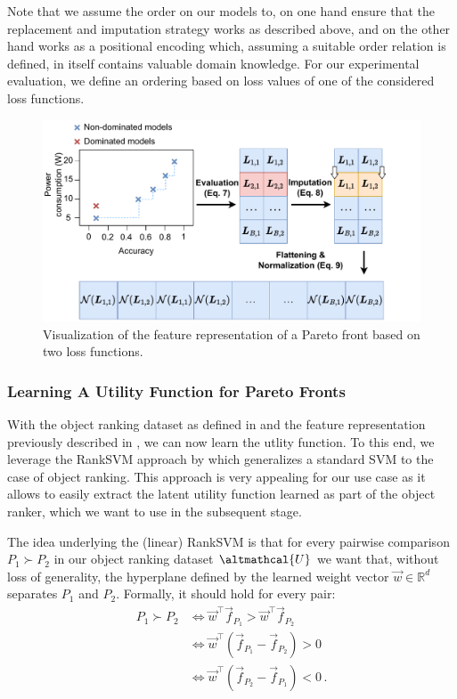 Note that we assume the order on our models to, on one hand ensure that the replacement and imputation strategy works as described above, and on the other hand works as a positional encoding which, assuming a suitable order relation is defined, in itself contains valuable domain knowledge. For our experimental evaluation, we define an ordering based on loss values of one of the considered loss functions.

\begin{figure}
\centering
\includegraphics[width=0.7\columnwidth]{chapters/human-centric/moo/img/preference_preparation.pdf}
\caption{Visualization of the feature representation of a Pareto front based on two loss functions.}
\label{moo-fig:preference_preparation}
\end{figure}

\subsubsection*{Learning A Utility Function for Pareto Fronts}

With the object ranking dataset as defined in  and the feature representation previously described in , we can now learn the utlity function. To this end, we leverage the RankSVM approach by \citet{joachims2002optimizing} which generalizes a standard SVM to the case of object ranking. This approach is very appealing for our use case as it allows to easily extract the latent utility function learned as part of the object ranker, which we want to use in the subsequent stage. 

The idea underlying the (linear) RankSVM is that for every pairwise comparison $P_{1} \succ P_{2}$ in our object ranking dataset $\altmathcal{U}$ we want that, without loss of generality, the hyperplane defined by the learned weight vector $\vec{w} \in \mathbb{R}^d$ separates $P_{1}$ and $P_{2}$. Formally, it should hold for every pair: %
\begin{align}
    P_{1} \succ P_{2} &\Leftrightarrow \vec{w}^\intercal\vec{f}_{P_{1}} > \vec{w}^\intercal\vec{f}_{P_{2}} \label{moo-eq:rank_svm_1} \\ 
    &\Leftrightarrow \vec{w}^\intercal\left(\vec{f}_{P_{1}}-\vec{f}_{P_{2}}\right) > 0 \label{moo-eq:rank_svm_2} \\ 
    &\Leftrightarrow \vec{w}^\intercal\left(\vec{f}_{P_{2}}-\vec{f}_{P_{1}}\right) < 0 \label{moo-eq:rank_svm_3} \, . 
\end{align}

